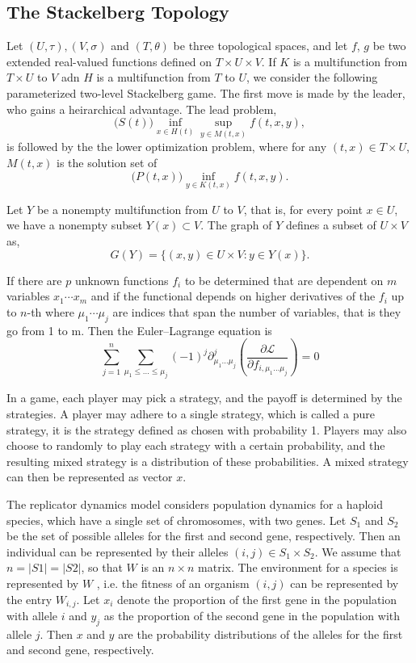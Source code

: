 \documentclass[10pt]{article}
\theoremstyle{definition}
\begin{document}
\subsection{The Stackelberg Topology}

Let $(U,\tau), (V,\sigma)$ and $(T,\theta)$ be three topological spaces, and let
$f$, $g$ be two extended real-valued functions defined on $T\times U\times V$.
If $K$ is a multifunction from $T\times U$ to $V$ adn $H$ is a multifunction
from $T$ to $U$, we consider the following parameterized two-level
Stackelberg game. The first move is made by the leader, who gains a heirarchical
advantage. The lead problem,
$$
\bigg(S(t)\bigg) \inf\limits_{x\in H(t)} \sup\limits_{y\in M(t,x)} f(t,x,y),
$$
is followed by the the lower optimization problem, where for any $(t,x)\in
T\times U$, $M(t,x)$ is the solution set of
$$
\bigg(P(t,x)\bigg) \inf\limits_{y\in K(t,x)} f(t,x,y).
$$

Let $Y$ be a nonempty multifunction from $U$ to $V$, that is, for every point
$x\in U$, we have a nonempty subset $Y(x) \subset V$. The graph of $Y$ defines
a subset of $U\times V$ as,
$$
G(Y) = \lbrace (x,y) \in U \times V : y\in Y(x)\rbrace.
$$

If there are $p$ unknown functions $f_i$ to be determined that are
dependent on $m$ variables $x_1 \cdots x_m$ and if the
functional depends on higher derivatives of the $f_i$ up to $n$-th
where $\mu_1 \cdots \mu_j$ are indices that span the number of variables, that is they go from 1 to m. Then the Euler–Lagrange equation is
$$
\sum_{j=1}^n \sum_{\mu_1 \leq \ldots \leq \mu_j} (-1)^j \partial_{ \mu_{1}\ldots \mu_{j} }^j \left( \frac{\partial \mathcal{L} }{\partial f_{i,\mu_1\dots\mu_j}}\right)=0
$$

In a game, each player may pick a strategy, and the payoff is determined by the
strategies. A player may adhere to a single strategy, which is called a pure
strategy, it is the strategy defined as chosen with probability 1.
Players may also choose to randomly to play each strategy with a
certain probability, and the resulting mixed strategy is a distribution of these
probabilities. A mixed strategy can then be represented as vector $x$. 

The replicator dynamics model considers population dynamics for a haploid
species, which have a single set of chromosomes, with two genes. Let $S_1$ and
$S_2$ be the set of possible alleles for the first and second gene,
respectively. Then an individual can be represented by their alleles $(i, j) \in
S_1 \times S_2$. We assume that $n = \vert S1 \vert = \vert S2 \vert$, so that
$W$ is an $n \times n$ matrix. The environment for a species is represented by
$W$ , i.e. the fitness of an organism $(i, j)$ can be represented by the entry
$W_{i,j}$. Let $x_i$ denote the proportion of the first gene in the population
with allele $i$ and $y_j$ as the proportion of the second gene in the population
with allele $j$. Then $x$ and $y$ are the probability distributions of the alleles for the first and second gene, respectively.
\end{document}
